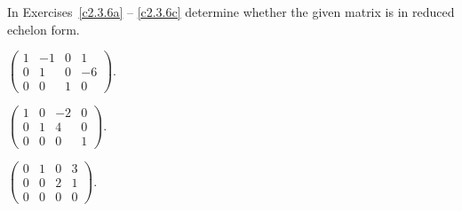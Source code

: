 \documentclass{ximera}
\begin{document}
\noindent In Exercises~\ref{c2.3.6a} -- \ref{c2.3.6c} determine
whether the given matrix is in reduced echelon form.
\begin{exercise} \label{c2.3.6a}
$\left(\begin{array}{rrrr}
1 & -1 &  0 &   1   \\
0 &  1 &  0 &  -6    \\
         0 &  0 &  1 &   0   \end{array}\right)$.
     \begin{multipleChoice}
     \end{multipleChoice}
\end{exercise}
\begin{exercise} \label{c2.3.6b}
$\left(\begin{array}{rrrr}
1 &  0 & -2 &   0   \\
0 &  1 &  4 &   0    \\
         0 &  0 &  0 &   1  \end{array}\right)$.
     \begin{multipleChoice}
     \end{multipleChoice}     
\end{exercise}
\begin{exercise} \label{c2.3.6c}
$\left(\begin{array}{rrrr}
0 &  1 &  0 &   3   \\
0 &  0 &  2 &   1    \\
         0 &  0 &  0 &   0   \end{array}\right)$.
     \begin{multipleChoice}
     \end{multipleChoice}     
\end{exercise}
\end{document}
